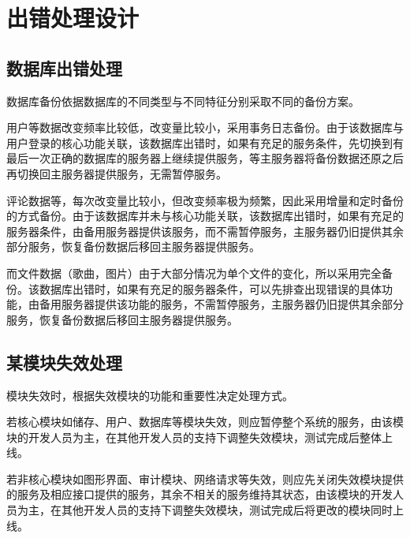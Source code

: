 \chapter{出错处理设计}
\section{数据库出错处理}

数据库备份依据数据库的不同类型与不同特征分别采取不同的备份方案。

用户等数据改变频率比较低，改变量比较小，采用事务日志备份。由于该数据库与用户登录的核心功能关联，该数据库出错时，如果有充足的服务条件，先切换到有最后一次正确的数据库的服务器上继续提供服务，等主服务器将备份数据还原之后再切换回主服务器提供服务，无需暂停服务。

评论数据等，每次改变量比较小，但改变频率极为频繁，因此采用增量和定时备份的方式备份。由于该数据库并未与核心功能关联，该数据库出错时，如果有充足的服务器条件，由备用服务器提供该服务，而不需暂停服务，主服务器仍旧提供其余部分服务，恢复备份数据后移回主服务器提供服务。

而文件数据（歌曲，图片）由于大部分情况为单个文件的变化，所以采用完全备份。该数据库出错时，如果有充足的服务器条件，可以先排查出现错误的具体功能，由备用服务器提供该功能的服务，不需暂停服务，主服务器仍旧提供其余部分服务，恢复备份数据后移回主服务器提供服务。

\section{某模块失效处理}
模块失效时，根据失效模块的功能和重要性决定处理方式。

若核心模块如储存、用户、数据库等模块失效，则应暂停整个系统的服务，由该模块的开发人员为主，在其他开发人员的支持下调整失效模块，测试完成后整体上线。

若非核心模块如图形界面、审计模块、网络请求等失效，则应先关闭失效模块提供的服务及相应接口提供的服务，其余不相关的服务维持其状态，由该模块的开发人员为主，在其他开发人员的支持下调整失效模块，测试完成后将更改的模块同时上线。